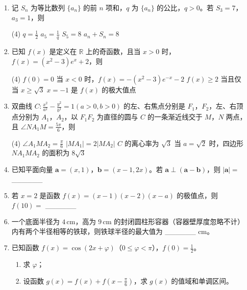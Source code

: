 \documentclass[UTF8]{ctexart}
\begin{document}
\begin{enumerate}[leftmargin=*, label=\textbf{\arabic*.}]
		\item 记 $S_n$ 为等比数列 $\{a_n\}$ 的前 $n$ 项和，$q$ 为 $\{a_n\}$ 的公比，$q > 0$。若 $S_3 = 7$，$a_3 = 1$，则
		\begin{tasks}(4)
			\task $q = \frac{1}{2}$
			\task $a_5 = \frac{1}{q}$
			\task $S_5 = 8$
			\task $a_n + S_n = 8$
		\end{tasks}
		
		\item 已知 $f(x)$ 是定义在 $\mathbb{R}$ 上的奇函数，且当 $x > 0$ 时，$f(x) = (x^2 - 3)e^x + 2$，则
		\begin{tasks}(4)
			\task $f(0) = 0$
			\task 当 $x < 0$ 时，$f(x) = -(x^2 - 3)e^{-x} - 2$
			\task $f(x) \geq 2$ 当且仅当 $x \geq \sqrt{3}$
			\task $x = -1$ 是 $f(x)$ 的极大值点
		\end{tasks}
		
		\item 双曲线 $C: \frac{x^2}{a^2} - \frac{y^2}{b^2} = 1 (a > 0, b > 0)$ 的左、右焦点分别是 $F_1$，$F_2$，左、右顶点分别为 $A_1$，$A_2$，以 $F_1F_2$ 为直径的圆与 $C$ 的一条渐近线交于 $M$，$N$ 两点，且 $\angle NA_1M = \frac{5\pi}{6}$，则
		\begin{tasks}(4)
			\task $\angle A_1MA_2 = \frac{\pi}{6}$
			\task $|MA_1| = 2|MA_2|$
			\task $C$ 的离心率为 $\sqrt{3}$
			\task 当 $a = \sqrt{2}$ 时，四边形 $NA_1MA_2$ 的面积为 $8\sqrt{3}$
		\end{tasks}
		
		\item 已知平面向量 $\boldsymbol{a} = (x, 1)$，$\boldsymbol{b} = (x - 1, 2x)$。若 $\boldsymbol{a} \perp (\boldsymbol{a} - \boldsymbol{b})$，则 $|\boldsymbol{a}| =$ \_\_\_\_\_\_
		
		\item 若 $x = 2$ 是函数 $f(x) = (x - 1)(x - 2)(x - a)$ 的极值点，则 $f(10) =$ \_\_\_\_\_\_
		
		\item 一个底面半径为 $4\,\mathrm{cm}$，高为 $9\,\mathrm{cm}$ 的封闭圆柱形容器（容器壁厚度忽略不计）内有两个半径相等的铁球，则铁球半径的最大值为 \_\_\_\_\_\_ $\mathrm{cm}$。
		
		 \item 已知函数 $ f(x) = \cos(2x + \varphi) $（$ 0 \leq \varphi < \pi $），$ f(0) = \frac{1}{2} $。
		\begin{enumerate}[label=(\roman*)]
			\item 求 $ \varphi $；
			\item 设函数 $ g(x) = f(x) + f\left(x - \frac{\pi}{6}\right) $，求 $ g(x) $ 的值域和单调区间。
		\end{enumerate}
		

\end{enumerate}
\end{document}
